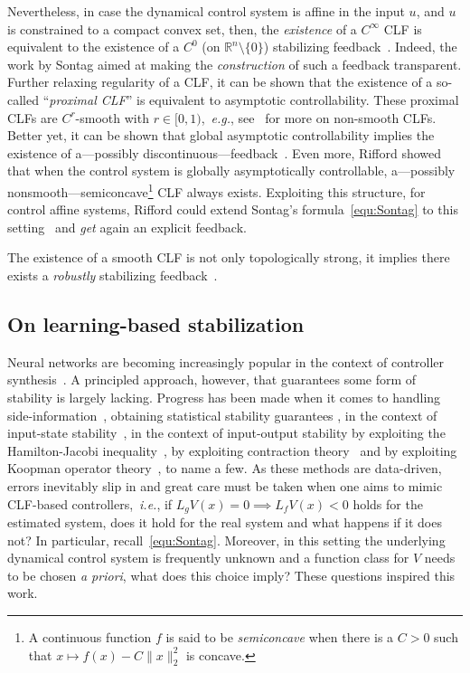 \documentclass[letterpaper, 10 pt, conference]{ieeeconf}  %
\theoremstyle{mystyle}
\begin{document}
Nevertheless, in case the dynamical control system is affine in the input $u$, and $u$ is constrained to a compact convex set, then, the \textit{existence} of a $C^{\infty}$ CLF is equivalent to the existence of a $C^0$ (on $\mathbb{R}^n\setminus\{0\}$) stabilizing feedback~\cite{ref:artstein1983stabilization}. Indeed, the work by Sontag aimed at making the \textit{construction} of such a feedback transparent. Further relaxing regularity of a CLF, it can be shown that the existence of a so-called ``\textit{proximal CLF}'' is equivalent to asymptotic controllability. These proximal CLFs are $C^r$-smooth with $r\in [0,1)$,~\textit{e.g.}, see~\cite{ref:clarke2010discontinuous} for more on non-smooth CLFs. Better yet, it can be shown that global asymptotic controllability implies the existence of a---possibly discontinuous---feedback~\cite{clarke1997asymptotic}. Even more, Rifford showed that when the control system is globally asymptotically controllable, a---possibly nonsmooth---semiconcave\footnote{A continuous function $f$ is said to be \textit{semiconcave} when there is a $C>0$ such that $x\mapsto f(x)-C\|x\|_2^2$ is concave.} CLF always exists. Exploiting this structure, for control affine systems, Rifford could extend Sontag's formula~\eqref{equ:Sontag} to this setting~\cite[Thm.~2.7]{ref:rifford2002semiconcave} and \textit{get} again an explicit feedback.


The existence of a smooth CLF is not only topologically strong, it implies there exists a \textit{robustly} stabilizing feedback~\cite{ref:ledyaev1999lyapunov}.


\subsection{On learning-based stabilization}
\label{sec:stab:project}
Neural networks are becoming increasingly popular in the context of controller synthesis~\cite{ref:jin2020neural,ref:gaby2021lyapunov,ref:mukherjee2022neural,ref:zhang2022neural}. A principled approach, however, that guarantees some form of stability is largely lacking. Progress has been made when it comes to handling side-information~\cite{ref:ahmadi2020learn}, obtaining statistical stability guarantees \cite{ref:boffi2021learn}, in the context of input-state stability~\cite{ref:yang2022input}, in the context of input-output stability by exploiting the Hamilton-Jacobi inequality~\cite{ref:okamoto2022learning}, by exploiting contraction theory~\cite{ref:rezazadeh2022learning} and by exploiting Koopman operator theory~\cite{ref:zinage2022neural}, to name a few.  
As these methods are data-driven, errors inevitably slip in and great care must be taken when one aims to mimic CLF-based controllers,~\textit{i.e.}, if $L_gV(x)=0\implies L_fV(x)<0$ holds for the estimated system, does it hold for the real system and what happens if it does not? In particular, recall~\eqref{equ:Sontag}. Moreover, in this setting the underlying dynamical control system is frequently unknown and a function class for $V$ needs to be chosen \textit{a priori}, what does this choice imply? These questions inspired this work. 
\end{document}
